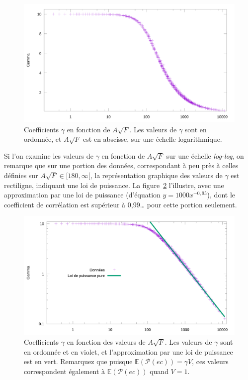 	\begin{figure}[!htb]
		\centering
		\includegraphics[width=\textwidth]{figures/ch4/asqrtFVgammaLog}
		\caption[Coefficients $\gamma$ en fonction de F et A, ter (log)]{Coefficients $\gamma$ en fonction de $A\sqrt{F}$. Les valeurs de $\gamma$ sont en ordonnée, et $A\sqrt{F}$ est en abscisse, sur une échelle logarithmique.}
		\label{fig:gammaASQRTFlog}
	\end{figure}
	
	Si l'on examine les valeurs de $\gamma$ en fonction de $A\sqrt{F}$ sur une échelle \emph{log-log}, on remarque que sur une portion des données, correspondant à peu près à celles définies sur $A\sqrt{F} \in [180,\infty[$, la représentation graphique des valeurs de $\gamma$ est rectiligne, indiquant une loi de puissance. La figure~\ref{fig:asqrtFVgammaLogLogUnbrokenPowerFit} l'illustre, avec une approximation par une loi de puissance (d'équation $y = 1000x^{-0,95}$), dont le coefficient de corrélation est supérieur à 0,99\ldots{} pour cette portion seulement.
	
	\begin{figure}[!htb]
		\centering
		\includegraphics[width=\textwidth]{figures/ch4/asqrtFVgammaLogLogUnbrokenPowerFit}
		\caption[Coefficients $\gamma$ en fonction de F et A, quater (log-log)]{Coefficients $\gamma$ en fonction des valeurs de $A\sqrt{F}$. Les valeurs de $\gamma$ sont en ordonnée et en violet, et l'approximation par une loi de puissance est en vert. Remarquez que puisque $\mathbb{E}(\mathcal{P}(ec)) = \gamma{}V$, ces valeurs correspondent également à $\mathbb{E}(\mathcal{P}(ec))$ quand $V = 1$.}
		\label{fig:asqrtFVgammaLogLogUnbrokenPowerFit}
	\end{figure}
	
